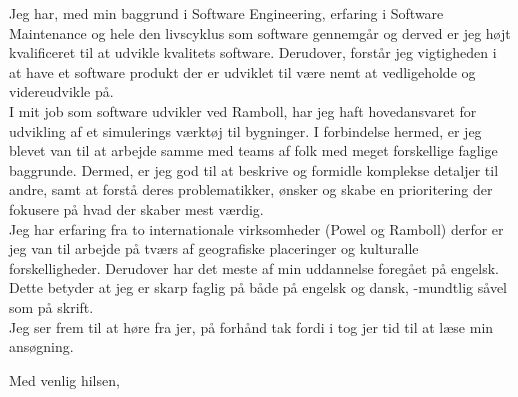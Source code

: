 \documentclass[10pt,a4paper]{altacv}
\begin{document}
Jeg har, med min baggrund i Software Engineering, erfaring i Software Maintenance og hele den livscyklus som software gennemgår og derved er jeg højt kvalificeret til at udvikle kvalitets software.
Derudover, forstår jeg vigtigheden i at have et software produkt der er udviklet til være nemt at vedligeholde og videreudvikle på.
\\
I mit job som software udvikler ved Ramboll, har jeg haft hovedansvaret for udvikling af et simulerings værktøj til bygninger.
I forbindelse hermed, er jeg blevet van til at arbejde samme med teams af folk med meget forskellige faglige baggrunde.
Dermed, er jeg god til at beskrive og formidle komplekse detaljer til andre, samt at forstå deres problematikker, ønsker og skabe en prioritering der fokusere på hvad der skaber mest værdig.
\\
Jeg har erfaring fra to internationale virksomheder (Powel og Ramboll) derfor er jeg van til arbejde på tværs af geografiske placeringer og kulturalle forskelligheder.
Derudover har det meste af min uddannelse foregået på engelsk.
Dette betyder at jeg er skarp faglig på både på engelsk og dansk, -mundtlig såvel som på skrift.
\\
\vspace{5mm} 
Jeg ser frem til at høre fra jer, på forhånd tak fordi i tog jer tid til at læse min ansøgning.


\vspace{5mm}
Med venlig hilsen,\\
\end{document}
